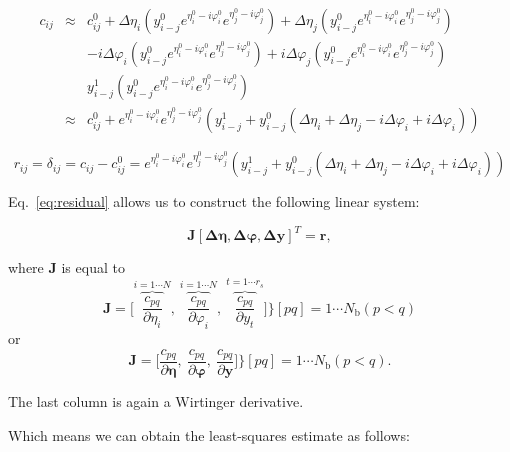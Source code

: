\documentclass[a4paper,fleqn,usenatbib]{mnras}
\begin{document}
\begin{eqnarray}
c_{ij} &\approx& c_{ij}^0 + \Delta \eta_i(y_{i-j}^0 e^{\eta_i^0 - i \varphi_i^0} e^{\eta_j^0 - i \varphi_j^0}) + \Delta \eta_j(y_{i-j}^0 e^{\eta_i^0 - i \varphi_i^0} e^{\eta_j^0 - i \varphi_j^0})\\
&& -i\Delta\varphi_i (y_{i-j}^0e^{\eta_i^0 - i \varphi_i^0} e^{\eta_j^0 - i \varphi_j^0}) +i\Delta\varphi_j (y_{i-j}^0e^{\eta_i^0 - i \varphi_i^0} e^{\eta_j^0 - i \varphi_j^0})\\
&& y_{i-j}^1(y_{i-j}^0e^{\eta_i^0 - i \varphi_i^0} e^{\eta_j^0 - i \varphi_j^0})\\
&\approx&  c_{ij}^0 + e^{\eta_i^0 - i \varphi_i^0} e^{\eta_j^0 - i \varphi_j^0}(y_{i-j}^1 + y_{i-j}^0( \Delta \eta_i+ \Delta \eta_j - i\Delta\varphi_i + i\Delta\varphi_i))
\end{eqnarray}

\begin{equation}
\label{eq:residual}
r_{ij} = \delta_{ij} = c_{ij}-c_{ij}^0 = e^{\eta_i^0 - i \varphi_i^0} e^{\eta_j^0 - i \varphi_j^0}(y_{i-j}^1 + y_{i-j}^0( \Delta \eta_i+ \Delta \eta_j - i\Delta\varphi_i + i\Delta\varphi_i)) 
\end{equation}

Eq.~\ref{eq:residual} allows us to construct the following linear system:

\begin{equation}
\boldsymbol{J}[\boldsymbol{\Delta \eta},\boldsymbol{\Delta \varphi},\boldsymbol{\Delta y}]^T = \boldsymbol{r}, 
\end{equation}

where $\boldsymbol{J}$ is equal to 
\begin{equation}
\boldsymbol{J} = \bigg [\overbrace{\frac{c_{pq}}{\partial \eta_i}}^{i= 1\cdots N},~\overbrace{\frac{c_{pq}}{\partial \varphi_i}}^{i= 1\cdots N},~\overbrace{\frac{c_{pq}}{\partial y_{t}}}^{t=1\cdots r_s} \bigg ] \bigg \} [pq] = 1\cdots N_{\textrm{b}} (p<q) 
\end{equation}
or
\begin{equation}
\boldsymbol{J} = \bigg [\frac{c_{pq}}{\partial \boldsymbol{\eta}},~\frac{c_{pq}}{\partial \boldsymbol{\varphi}},~\frac{c_{pq}}{\partial \boldsymbol{y}} \bigg ] \bigg \} [pq] = 1\cdots N_{\textrm{b}} (p<q). 
\end{equation}

The last column is again a Wirtinger derivative.

Which means we can obtain the least-squares estimate as follows:
\end{document}
